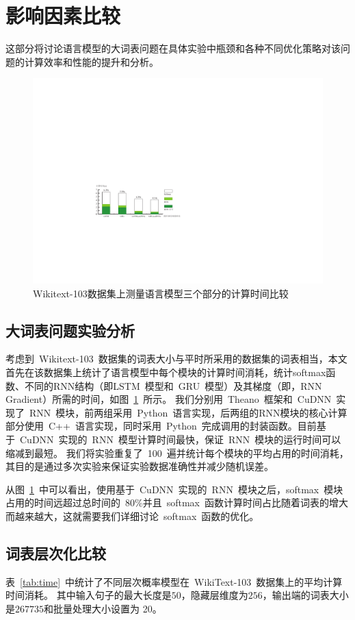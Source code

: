 \section{影响因素比较}

这部分将讨论语言模型的大词表问题在具体实验中瓶颈和各种不同优化策略对该问题的计算效率和性能的提升和分析。
\begin{figure}[!b]
  \centering
  \includegraphics[width=.9\columnwidth]{./figures/rnn_timing.pdf}
  \caption{Wikitext-103数据集上测量语言模型三个部分的计算时间比较}\label{fig:rnn_timing}
\end{figure}
\subsection{大词表问题实验分析}

考虑到~Wikitext-103~数据集的词表大小与平时所采用的数据集的词表相当，本文首先在该数据集上统计了语言模型中每个模块的计算时间消耗，统计softmax函数、不同的RNN结构（即LSTM~模型和~GRU~模型）及其梯度（即，RNN Gradient）所需的时间，如图~\ref{fig:rnn_timing}~所示。
我们分别用~Theano~框架和~CuDNN~实现了~RNN~模块，前两组采用~Python~语言实现，后两组的RNN模块的核心计算部分使用~C++~语言实现，同时采用~Python~完成调用的封装函数。目前基于~CuDNN~实现的~RNN~模型计算时间最快，保证~RNN~模块的运行时间可以缩减到最短。 我们将实验重复了~100~遍并统计每个模块的平均占用的时间消耗，其目的是通过多次实验来保证实验数据准确性并减少随机误差。


从图~\ref{fig:rnn_timing}~中可以看出，使用基于~CuDNN~实现的~RNN~模块之后，softmax~模块占用的时间远超过总时间的~80\%并且~softmax~函数计算时间占比随着词表的增大而越来越大，这就需要我们详细讨论~softmax~函数的优化。


\subsection{词表层次化比较}
表~\ref{tab:time}~中统计了不同层次概率模型在~WikiText-103~数据集上的平均计算时间消耗。
其中输入句子的最大长度是$50$，隐藏层维度为$256$，输出端的词表大小是$267735$和批量处理大小设置为 20。

